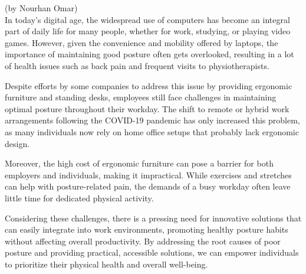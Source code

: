 (by Nourhan Omar)\\

\p
In today's digital age, the widespread use of computers has become an integral part of daily life for many people, whether for work, studying, or playing video games. However, given the convenience and mobility offered by laptops, the importance of maintaining good posture often gets overlooked, resulting in a lot of health issues such as back pain and frequent visits to physiotherapists.

\p
Despite efforts by some companies to address this issue by providing ergonomic furniture and standing desks, employees still face challenges in maintaining optimal posture throughout their workday. The shift to remote or hybrid work arrangements following the COVID-19 pandemic has only increased this problem, as many individuals now rely on home office setups that probably lack ergonomic design.

\p
Moreover, the high cost of ergonomic furniture can pose a barrier for both employers and individuals, making it impractical. While exercises and stretches can help with posture-related pain, the demands of a busy workday often leave little time for dedicated physical activity.

\p
Considering these challenges, there is a pressing need for innovative solutions that can easily integrate into work environments, promoting healthy posture habits without affecting overall productivity. By addressing the root causes of poor posture and providing practical, accessible solutions, we can empower individuals to prioritize their physical health and overall well-being.